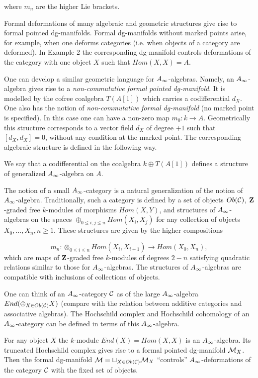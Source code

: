\documentclass[a4paper,12pt]{article}
\begin{document}
where $m_n$ are the higher Lie brackets.

Formal deformations of many algebraic and geometric structures
give rise to formal pointed dg-manifolds. Formal dg-manifolds without marked points
arise, for example, when one deforms categories (i.e. when  objects of a category are deformed).
In  Example 2 the corresponding dg-manifold controls deformations of the category
with one object $X$ such that $Hom(X,X)=A$.

One can develop a similar geometric language for $A_{\infty}$-algebras.
Namely, an $A_{\infty}$-algebra gives rise to a {\it non-commutative
formal pointed dg-manifold}. It is modelled by the cofree
coalgebra $T(A[1])$ which carries a codifferential $d_X$.
One also has the notion of
{\it non-commutative formal dg-manifold} (no marked point is specified).
In this case one can have a non-zero map $m_0:k\to A$. Geometrically
this structure corresponds to a vector field $d_X$ of degree $+1$
such that 
$[d_X,d_X]=0$, without any condition at the marked point. 
The corresponding algebraic structure is defined in the following way.

\begin{dfn} We say that a codifferential on the coalgebra
$k\oplus T(A[1])$ defines a structure of
generalized $A_{\infty}$-algebra on $A$.


\end{dfn}

The notion of a small $A_{\infty}$-category is a natural generalization of the notion of
$A_{\infty}$-algebra. Traditionally, such a category  is defined by a set of objects $Ob({\cal C})$,
${\bf Z}$-graded free $k$-modules of morphisms $Hom(X,Y)$,
and structures of $A_{\infty}$-algebras on the
spaces $\oplus_{0\le i,j\le n}Hom(X_i,X_j)$ for any collection
of objects $X_0,...,X_n, n\ge 1$. These structures are 
given by the higher compositions

$$m_n:\otimes_{0\le i\le n}Hom(X_i,X_{i+1})\to Hom(X_0,X_n),$$
which are maps of ${\bf Z}$-graded free $k$-modules of degrees $2-n$
satisfying quadratic relations similar to those for $A_{\infty}$-algebras.
The structures of $A_{\infty}$-algebras are compatible with inclusions
of collections of objects.

One can think of an $A_{\infty}$-category ${\cal C}$ as of the large $A_{\infty}$-algebra
$End(\oplus_{X\in Ob({\cal C})}X)$ (compare with the relation between
additive categories and associative algebras). 
The Hochschild complex and Hochschild
cohomology of an $A_{\infty}$-category can be defined in terms of this $A_{\infty}$-algebra.

For any object $X$ the $k$-module $End(X)=Hom(X,X)$
is an $A_{\infty}$-algebra. Its truncated  Hochschild complex
gives rise to a formal pointed dg-manifold ${\cal M}_X$.
Then the formal dg-manifold ${\cal M}=\sqcup_{X\in Ob({\cal C})} {\cal M}_X$
``controls'' $A_{\infty}$-deformations of the category ${\cal C}$ with the fixed
set of objects.
\end{document}

